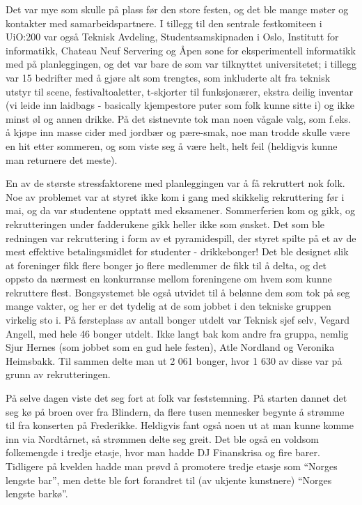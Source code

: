 Det var mye som skulle på plass før den store festen, og det ble mange møter og kontakter med samarbeidspartnere. I tillegg til den sentrale festkomiteen i UiO:200 var også Teknisk Avdeling, Studentsamskipnaden i Oslo, Institutt for informatikk, Chateau Neuf Servering og Åpen sone for eksperimentell informatikk med på planleggingen, og det var bare de som var tilknyttet universitetet; i tillegg var 15 bedrifter med å gjøre alt som trengtes, som inkluderte alt fra teknisk utstyr til scene, festivaltoaletter, t-skjorter til funksjonærer, ekstra deilig inventar (vi leide inn laidbags - basically kjempestore puter som folk kunne sitte i) og ikke minst øl og annen drikke. På det sistnevnte tok man noen vågale valg, som f.eks. å kjøpe inn masse cider med jordbær og pære-smak, noe man trodde skulle være en hit etter sommeren, og som viste seg å være helt, helt feil (heldigvis kunne man returnere det meste).

En av de største stressfaktorene med planleggingen var å få rekruttert nok folk. Noe av problemet var at styret ikke kom i gang med skikkelig rekruttering før i mai, og da var studentene opptatt med eksamener. Sommerferien kom og gikk, og rekrutteringen under fadderukene gikk heller ikke som ønsket. Det som ble redningen var rekruttering i form av et pyramidespill, der styret spilte på et av de mest effektive betalingsmidlet for studenter - drikkebonger! Det ble designet slik at foreninger fikk flere bonger jo flere medlemmer de fikk til å delta, og det oppsto da nærmest en konkurranse mellom foreningene om hvem som kunne rekruttere flest. Bongsystemet ble også utvidet til å belønne dem som tok på seg mange vakter, og her er det tydelig at de som jobbet i den tekniske gruppen virkelig sto i. På førsteplass av antall bonger utdelt var Teknisk sjef selv, Vegard Angell, med hele 46 bonger utdelt. Ikke langt bak kom andre fra gruppa, nemlig Sjur Hernes (som jobbet som en gud hele festen), Atle Nordland og Veronika Heimsbakk. Til sammen delte man ut 2 061 bonger, hvor 1 630 av disse var på grunn av rekrutteringen.

På selve dagen viste det seg fort at folk var feststemning. På starten dannet det seg kø på broen over fra Blindern, da flere tusen mennesker begynte å strømme til fra konserten på Frederikke. Heldigvis fant også noen ut at man kunne komme inn via Nordtårnet, så strømmen delte seg greit. Det ble også en voldsom folkemengde i tredje etasje, hvor man hadde DJ Finanskrisa og fire barer. Tidligere på kvelden hadde man prøvd å promotere tredje etasje som ``Norges lengste bar'', men dette ble fort forandret til (av ukjente kunstnere) ``Norges lengste barkø''.

